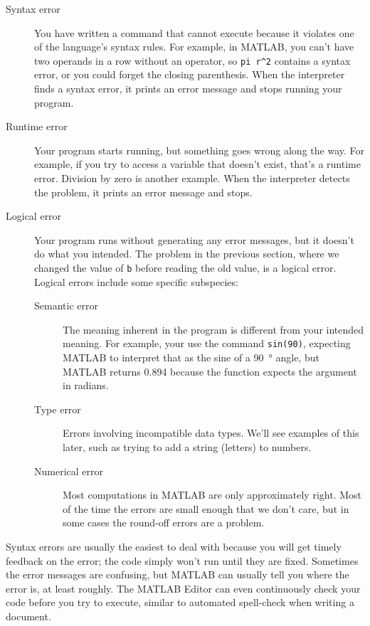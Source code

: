 \begin{description}

\item[Syntax error] You have written a command that cannot execute because it violates one of the language's syntax rules.  For example, in MATLAB, you can't have two operands in a row without an operator, so \lstinline{pi r^2} contains a syntax error, or you could forget the closing parenthesis.  When the interpreter finds a syntax error, it prints an error message and stops running your program.

\item[Runtime error] Your program starts running, but something goes wrong along the way.  For example, if you try to access a variable that doesn't exist, that's a runtime error.  Division by zero is another example.  When the interpreter detects the problem, it prints an error message and stops.

\item[Logical error] Your program runs without generating any error messages, but it doesn't do what you intended.  The problem in the previous section, where we changed the value of \lstinline{b} before reading the old value, is a logical error.  Logical errors include some specific subspecies:
\begin{description}
    \item [Semantic error] The meaning inherent in the program is different from your intended meaning.  For example, your use the command \lstinline{sin(90)}, expecting MATLAB to interpret that as the sine of a \SI{90}{\degree} angle, but MATLAB returns 0.894 because the function expects the argument in radians.
    \item [Type error] Errors involving incompatible data types.  We'll see examples of this later, such as trying to add a string (letters) to numbers.
    \item[Numerical error] Most computations in MATLAB are only approximately right.  Most of the time the errors are small enough that we don't care, but in some cases the round-off errors are a problem.
\end{description}
\end{description}

Syntax errors are usually the easiest to deal with because you will get timely feedback on the error; the code simply won't run until they are fixed.  Sometimes the error messages are confusing, but MATLAB can usually tell you where the error is, at least roughly.  The MATLAB Editor can even continuously check your code before you try to execute, similar to automated spell-check when writing a document.

